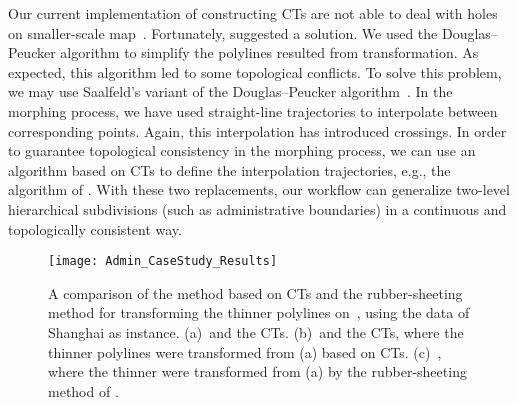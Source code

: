 Our current implementation of constructing CTs 
are not able to deal with holes on smaller-scale map~\ms.
Fortunately, \textcite{BabikovSW97} suggested a solution.
We used the Douglas--Peucker algorithm to simplify the
polylines resulted from transformation.  
As expected, this algorithm led to some topological conflicts.
To solve this problem, we may use Saalfeld's variant of the 
Douglas--Peucker algorithm~\parencite{Saalfeld1999}.
In the morphing process, 
we have used straight-line trajectories 
to interpolate between corresponding points.
Again, this interpolation has introduced crossings.
In order to guarantee topological consistency 
in the morphing process,
we can use an algorithm based on CTs
to define the interpolation trajectories, 
e.g., the algorithm of \textcite{GotsmanS2001}. 
With these two replacements, our workflow can
generalize two-level hierarchical subdivisions 
(such as administrative boundaries) 
in a continuous and topologically consistent way.

\begin{figure}[tb]
	\centering
	\texttt{[image: Admin\_CaseStudy\_Results]}
	\caption{A comparison of the method based on CTs and 
		the rubber-sheeting method 
		for	transforming the thinner polylines on~\ml, 
		using the data of Shanghai as instance. 
		(a)~\ml and the CTs. 
		(b)~\ms and the CTs, where the thinner polylines 
		were transformed from (a) based on CTs.
		(c)~\ms, where the thinner were transformed from (a) 
		by the rubber-sheeting method
		of \textcite{Doytsher2001}.} 
	\label{fig:Admin_CT-RS-Comarison-shanghai}
\end{figure}






